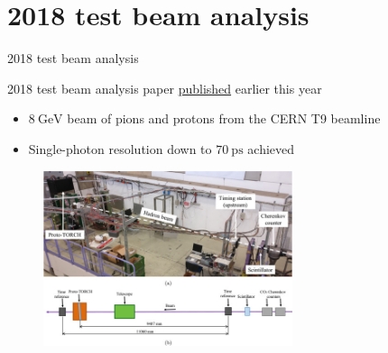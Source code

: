 \documentclass[xcolor={dvipsnames}]{beamer}
\begin{document}
\section{2018 test beam analysis}
\begin{frame}{2018 test beam analysis}
  \vspace{0.0cm}
  \begin{center}
    {\large 2018 test beam analysis paper \href{https://www.sciencedirect.com/science/article/pii/S0168900223001717}{published} earlier this year}
  \end{center}
  \begin{itemize}
    \setlength\itemsep{0.3em}
    \item{$\SI{8}{\giga\eV}$ beam of pions and protons from the CERN T9 beamline}
    \item{Single-photon resolution down to $\SI{70}{\pico\second}$ achieved}
  \end{itemize}
  \begin{figure}
    \centering
    \includegraphics[width = 0.65\textwidth]{Figs/TORCH_testbeam_2018_setup.jpg}
  \end{figure}
\end{frame}
\end{document}
